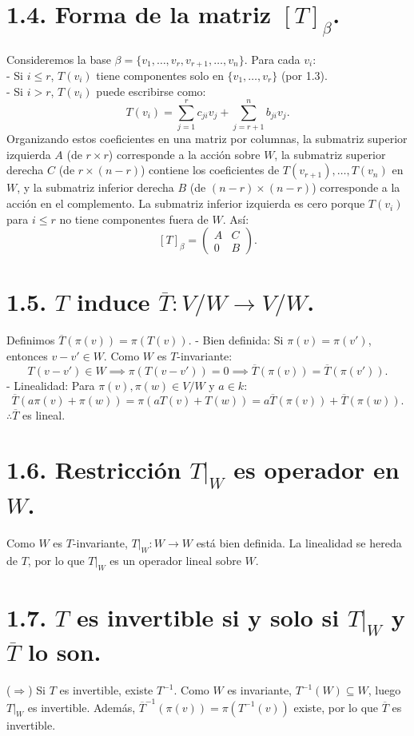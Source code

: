 \documentclass{article}
\begin{document}
\section{1.4. Forma de la matriz \([T]_{\beta}\).}
Consideremos la base \(\beta = \{v_1, \ldots, v_r, v_{r+1}, \ldots, v_n\}\). Para cada \(v_i\):  \\
- Si \(i \leq r\), \(T(v_i)\) tiene componentes solo en \(\{v_1, \ldots, v_r\}\) (por 1.3).  \\
- Si \(i > r\), \(T(v_i)\) puede escribirse como:  
\[
T(v_i) = \sum_{j=1}^r c_{ji} v_j + \sum_{j=r+1}^n b_{ji} v_j.
\]  
Organizando estos coeficientes en una matriz por columnas, la submatriz superior izquierda \(A\) (de \(r \times r\)) corresponde a la acción sobre \(W\), la submatriz superior derecha \(C\) (de \(r \times (n-r)\)) contiene los coeficientes de \(T(v_{r+1}), \ldots, T(v_n)\) en \(W\), y la submatriz inferior derecha \(B\) (de \((n-r) \times (n-r)\)) corresponde a la acción en el complemento. La submatriz inferior izquierda es cero porque \(T(v_i)\) para \(i \leq r\) no tiene componentes fuera de \(W\). Así:  
\[
[T]_{\beta} = \begin{pmatrix} A & C \\ 0 & B \end{pmatrix}.
\]

\section{1.5. \(T\) induce \(\overline{T}: V/W \to V/W\).}
Definimos \(\overline{T}(\pi(v)) = \pi(T(v))\).  
- Bien definida: Si \(\pi(v) = \pi(v')\), entonces \(v - v' \in W\). Como \(W\) es \(T\)-invariante:  
\[
T(v - v') \in W \implies \pi(T(v - v')) = 0 \implies \overline{T}(\pi(v)) = \overline{T}(\pi(v')).
\]  
- Linealidad: Para \(\pi(v), \pi(w) \in V/W\) y \(a \in k\):  
\[
\overline{T}(a\pi(v) + \pi(w)) = \pi(a T(v) + T(w)) = a\overline{T}(\pi(v)) + \overline{T}(\pi(w)).
\]  
\( \therefore \overline{T}\) es lineal.

\section{1.6. Restricción \(T|_W\) es operador en \(W\).}
Como \(W\) es \(T\)-invariante, \(T|_W: W \to W\) está bien definida. La linealidad se hereda de \(T\), por lo que \(T|_W\) es un operador lineal sobre \(W\).

\section{1.7. \(T\) es invertible si y solo si \(T|_W\) y \(\overline{T}\) lo son.}  
($\Rightarrow$) Si \(T\) es invertible, existe \(T^{-1}\). Como \(W\) es invariante, \(T^{-1}(W) \subseteq W\), luego \(T|_W\) es invertible. Además, \(\overline{T}^{-1}(\pi(v)) = \pi(T^{-1}(v))\) existe, por lo que \(\overline{T}\) es invertible.  
\end{document}
